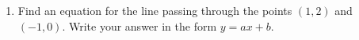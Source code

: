 \documentclass[12pt]{article}
\newenvironment{solution}{\begin{proof}[Solution]}{\end{proof}}
\begin{document}
\begin{enumerate}
\begin{solution}
\begin{itemize}
			\end{itemize}
		\end{solution}
		
		
		\item Find an equation for the line passing through the points $(1,2)$ and $(-1,0)$. Write your answer in the form $y=ax+b$.
		

\end{enumerate}
\end{document}

